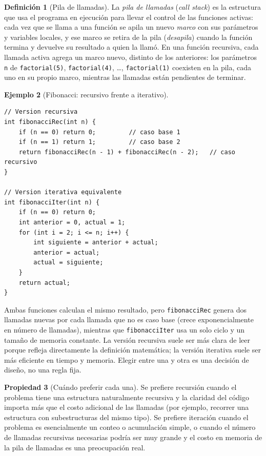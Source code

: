 \documentclass[11pt,letterpaper]{article}
\theoremstyle{definition}
\newtheorem{definicion}{Definición}[section]
\newtheorem{ejemplo}[definicion]{Ejemplo}
\newtheorem{propiedad}[definicion]{Propiedad}
\begin{document}
\begin{definicion}[Pila de llamadas]
La \emph{pila de llamadas} (\emph{call stack}) es la estructura que usa el programa en ejecución
para llevar el control de las funciones activas: cada vez que se llama a una función se apila un
nuevo \emph{marco} con sus parámetros y variables locales, y ese marco se retira de la pila
(\emph{desapila}) cuando la función termina y devuelve su resultado a quien la llamó. En una
función recursiva, cada llamada activa agrega un marco nuevo, distinto de los anteriores: los
parámetros \texttt{n} de \texttt{factorial(5)}, \texttt{factorial(4)}, \ldots, \texttt{factorial(1)}
coexisten en la pila, cada uno en su propio marco, mientras las llamadas están pendientes de
terminar.
\end{definicion}

\begin{ejemplo}[Fibonacci: recursivo frente a iterativo]
\begin{lstlisting}
// Version recursiva
int fibonacciRec(int n) {
    if (n == 0) return 0;         // caso base 1
    if (n == 1) return 1;         // caso base 2
    return fibonacciRec(n - 1) + fibonacciRec(n - 2);   // caso recursivo
}

// Version iterativa equivalente
int fibonacciIter(int n) {
    if (n == 0) return 0;
    int anterior = 0, actual = 1;
    for (int i = 2; i <= n; i++) {
        int siguiente = anterior + actual;
        anterior = actual;
        actual = siguiente;
    }
    return actual;
}
\end{lstlisting}
Ambas funciones calculan el mismo resultado, pero \texttt{fibonacciRec} genera dos llamadas nuevas
por cada llamada que no es caso base (crece exponencialmente en número de llamadas), mientras que
\texttt{fibonacciIter} usa un solo ciclo y un tamaño de memoria constante. La versión recursiva
suele ser más clara de leer porque refleja directamente la definición matemática; la versión
iterativa suele ser más eficiente en tiempo y memoria. Elegir entre una y otra es una decisión de
diseño, no una regla fija.
\end{ejemplo}

\begin{propiedad}[Cuándo preferir cada una]
Se prefiere recursión cuando el problema tiene una estructura naturalmente recursiva y la claridad
del código importa más que el costo adicional de las llamadas (por ejemplo, recorrer una
estructura con subestructuras del mismo tipo). Se prefiere iteración cuando el problema es
esencialmente un conteo o acumulación simple, o cuando el número de llamadas recursivas necesarias
podría ser muy grande y el costo en memoria de la pila de llamadas es una preocupación real.
\end{propiedad}
\end{document}
